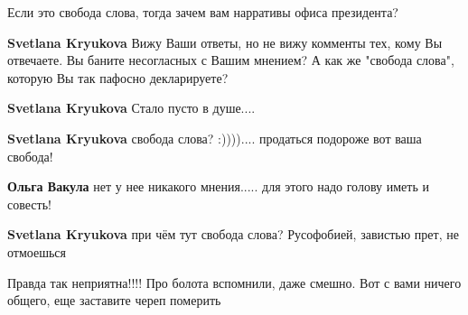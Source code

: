\begin{itemize}
\begin{itemize}
Если это свобода слова, тогда зачем вам нарративы офиса президента?

 
\textbf{Svetlana Kryukova} Вижу Ваши ответы, но не вижу комменты тех, кому Вы отвечаете.
Вы баните несогласных с Вашим мнением?
А как же "свобода слова", которую Вы так пафосно декларируете?

 
\textbf{Svetlana Kryukova} Стало пусто в душе....

 
\textbf{Svetlana Kryukova} свобода слова? :)))).... продаться подороже вот ваша свобода!

 
\textbf{Ольга Вакула} нет у нее никакого мнения..... для этого надо голову иметь и совесть!

 
\textbf{Svetlana Kryukova} при чём тут свобода слова? Русофобией, завистью прет, не отмоешься

 
Правда так неприятна!!!! Про болота вспомнили, даже смешно. Вот с вами ничего общего, еще заставите череп померить


\end{itemize}
\end{itemize}
